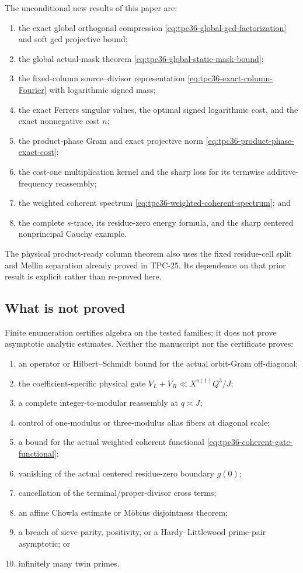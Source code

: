 The unconditional new results of this paper are:
\begin{enumerate}[label=(\roman*)]
 \item the exact global orthogonal compression
 \eqref{eq:tpc36-global-gcd-factorization} and soft gcd projective bound;
 \item the global actual-mask theorem
 \eqref{eq:tpc36-global-static-mask-bound};
 \item the fixed-column source--divisor representation
 \eqref{eq:tpc36-exact-column-Fourier} with logarithmic signed mass;
 \item the exact Ferrers singular values, the optimal signed logarithmic
 cost, and the exact nonnegative cost \(n\);
 \item the product-phase Gram and exact projective norm
 \eqref{eq:tpc36-product-phase-exact-cost};
 \item the cost-one multiplication kernel and the sharp loss for its
 termwise additive-frequency reassembly;
 \item the weighted coherent spectrum
 \eqref{eq:tpc36-weighted-coherent-spectrum}; and
 \item the complete \(s\)-trace, its residue-zero energy formula, and the
 sharp centered nonprincipal Cauchy example.
\end{enumerate}
The physical product-ready column theorem also uses the fixed
residue-cell split and Mellin separation already proved in TPC-25.  Its
dependence on that prior result is explicit rather than re-proved here.

\subsection{What is not proved}

Finite enumeration certifies algebra on the tested families; it does not
prove asymptotic analytic estimates.  Neither the manuscript nor the
certificate proves:
\begin{enumerate}[label=(\roman*)]
 \item an operator or Hilbert--Schmidt bound for the actual orbit-Gram
 off-diagonal;
 \item the coefficient-specific physical gate
 \(V_L+V_R\ll X^{o(1)}Q^3/J\);
 \item a complete integer-to-modular reassembly at \(q\asymp J\);
 \item control of one-modulus or three-modulus alias fibers at diagonal
 scale;
 \item a bound for the actual weighted coherent functional
 \eqref{eq:tpc36-coherent-gate-functional};
 \item vanishing of the actual centered residue-zero boundary \(g(0)\);
 \item cancellation of the terminal/proper-divisor cross terms;
 \item an affine Chowla estimate or M\"obius disjointness theorem;
 \item a breach of sieve parity, positivity, or a Hardy--Littlewood
 prime-pair asymptotic; or
 \item infinitely many twin primes.
\end{enumerate}


